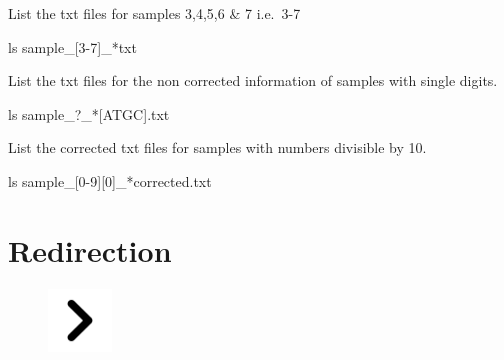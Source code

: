 \documentclass[
  letterpaper,
  DIV=11,
  numbers=noendperiod]{scrreprt}
\newenvironment{Shaded}{\begin{snugshade}}{\end{snugshade}}
\newcommand{\FunctionTok}[1]{\textcolor[rgb]{0.28,0.35,0.67}{#1}}
\newcommand{\NormalTok}[1]{\textcolor[rgb]{0.00,0.23,0.31}{#1}}
\newcommand{\PreprocessorTok}[1]{\textcolor[rgb]{0.68,0.00,0.00}{#1}}
\newcommand{\SpecialStringTok}[1]{\textcolor[rgb]{0.13,0.47,0.30}{#1}}
\begin{document}
List the txt files for samples 3,4,5,6 \& 7 i.e.~3-7

\begin{Shaded}
\begin{Highlighting}[]
\FunctionTok{ls}\NormalTok{ sample\_}\PreprocessorTok{[}\SpecialStringTok{3}\PreprocessorTok{{-}}\SpecialStringTok{7}\PreprocessorTok{]}\NormalTok{\_}\PreprocessorTok{*}\NormalTok{txt}
\end{Highlighting}
\end{Shaded}

List the txt files for the non corrected information of samples with
single digits.

\begin{Shaded}
\begin{Highlighting}[]
\FunctionTok{ls}\NormalTok{ sample\_}\PreprocessorTok{?}\NormalTok{\_}\PreprocessorTok{*[}\SpecialStringTok{ATGC}\PreprocessorTok{]}\NormalTok{.txt}
\end{Highlighting}
\end{Shaded}

List the corrected txt files for samples with numbers divisible by 10.

\begin{Shaded}
\begin{Highlighting}[]
\FunctionTok{ls}\NormalTok{ sample\_}\PreprocessorTok{[}\SpecialStringTok{0}\PreprocessorTok{{-}}\SpecialStringTok{9}\PreprocessorTok{][}\SpecialStringTok{0}\PreprocessorTok{]}\NormalTok{\_}\PreprocessorTok{*}\NormalTok{corrected.txt}
\end{Highlighting}
\end{Shaded}

\hypertarget{redirection}{%
\section{Redirection}\label{redirection}}

\begin{figure}

{\centering \includegraphics[width=0.15\textwidth,height=\textheight]{figures/chevron.png}

}

\end{figure}
\end{document}
